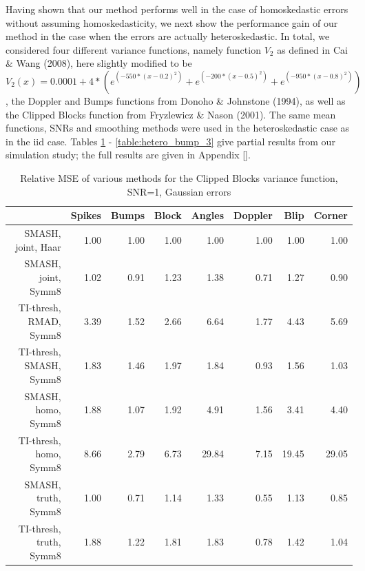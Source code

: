 \documentclass[12pt]{article}
\begin{document}
Having shown that our method performs well in the case of homoskedastic errors without assuming homoskedasticity, we next show the performance gain of our method in the case when the errors are actually heteroskedastic. In total, we considered four different variance functions, namely function $V_2$ as defined in Cai \& Wang (2008), here slightly modified to be
\[V_2(x)=0.0001+4*(e^{(-550*(x-0.2)^2)}+e^{(-200*(x-0.5)^2)}+e^{(-950*(x-0.8)^2)})\]
, the Doppler and Bumps functions from Donoho \& Johnstone (1994), as well as the Clipped Blocks function from Fryzlewicz \& Nason (2001). The same mean functions, SNRs and smoothing methods were used in the heteroskedastic case as in the iid case. Tables \ref{table:hetero_v2_1} - \ref{table:hetero_bump_3} give partial results from our simulation study; the full results are given in Appendix \ref{}.\\
\begin{table}[ht]
\centering
\begin{tabular}{rrrrrrrr}
  \hline
 & Spikes & Bumps & Block & Angles & Doppler & Blip & Corner \\
  \hline
SMASH, joint, Haar & 1.00 & 1.00 & 1.00 & 1.00 & 1.00 & 1.00 & 1.00 \\
  SMASH, joint, Symm8 & 1.02 & 0.91 & 1.23 & 1.38 & 0.71 & 1.27 & 0.90 \\
  TI-thresh, RMAD, Symm8 & 3.39 & 1.52 & 2.66 & 6.64 & 1.77 & 4.43 & 5.69 \\
  TI-thresh, SMASH, Symm8 & 1.83 & 1.46 & 1.97 & 1.84 & 0.93 & 1.56 & 1.03 \\
  SMASH, homo, Symm8 & 1.88 & 1.07 & 1.92 & 4.91 & 1.56 & 3.41 & 4.40 \\
  TI-thresh, homo, Symm8 & 8.66 & 2.79 & 6.73 & 29.84 & 7.15 & 19.45 & 29.05 \\
  SMASH, truth, Symm8 & 1.00 & 0.71 & 1.14 & 1.33 & 0.55 & 1.13 & 0.85 \\
  TI-thresh, truth, Symm8 & 1.88 & 1.22 & 1.81 & 1.83 & 0.78 & 1.42 & 1.04 \\
   \hline
\end{tabular}
\caption{Relative MSE of various methods for the Clipped Blocks variance function, SNR=1, Gaussian errors} 
\label{table:hetero_v2_1}
\end{table}
\end{document}
